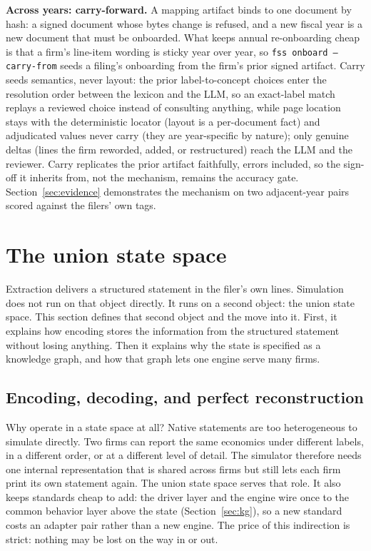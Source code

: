 \documentclass[11pt]{article}
\newcommand{\lead}[2]{\par\addvspace{5pt}\textbf{\textcolor{#1}{#2}}}
\begin{document}
\lead{navytwo}{Across years: carry-forward.} A mapping artifact binds to one document by hash: a signed document whose bytes change is refused, and a new fiscal year is a new document that must be onboarded. What keeps annual re-onboarding cheap is that a firm's line-item wording is sticky year over year, so \texttt{fss onboard --carry-from} seeds a filing's onboarding from the firm's prior signed artifact. Carry seeds semantics, never layout: the prior label-to-concept choices enter the resolution order between the lexicon and the LLM, so an exact-label match replays a reviewed choice instead of consulting anything, while page location stays with the deterministic locator (layout is a per-document fact) and adjudicated values never carry (they are year-specific by nature); only genuine deltas (lines the firm reworded, added, or restructured) reach the LLM and the reviewer. Carry replicates the prior artifact faithfully, errors included, so the sign-off it inherits from, not the mechanism, remains the accuracy gate. Section~\ref{sec:evidence} demonstrates the mechanism on two adjacent-year pairs scored against the filers' own tags.

\section{The union state space}
\label{sec:statespace}
Extraction delivers a structured statement in the filer's own lines. Simulation does not run on that object directly. It runs on a second object: the union state space. This section defines that second object and the move into it. First, it explains how encoding stores the information from the structured statement without losing anything. Then it explains why the state is specified as a knowledge graph, and how that graph lets one engine serve many firms.

\subsection{Encoding, decoding, and perfect reconstruction}
\label{sec:reconstruction}
Why operate in a state space at all? Native statements are too heterogeneous to simulate directly. Two firms can report the same economics under different labels, in a different order, or at a different level of detail. The simulator therefore needs one internal representation that is shared across firms but still lets each firm print its own statement again. The union state space serves that role. It also keeps standards cheap to add: the driver layer and the engine wire once to the common behavior layer above the state (Section~\ref{sec:kg}), so a new standard costs an adapter pair rather than a new engine. The price of this indirection is strict: nothing may be lost on the way in or out.
\end{document}
